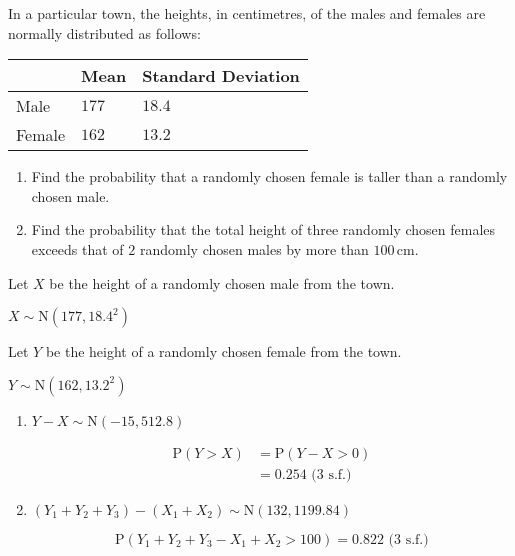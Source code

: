 \documentclass[11pt,a4paper]{book}
\begin{document}
\newpage

\begin{example}

In a particular town, the heights, in centimetres, of the males and
females are normally distributed as follows:
\begin{center}
\setlength{\extrarowheight}{2pt}%
\begin{tabular}{|>{\centering}p{4cm}|>{\centering}p{4cm}|>{\centering}p{4cm}|}
\hline
 & Mean & Standard Deviation\tabularnewline
\hline
Male & $177$ & $18.4$\tabularnewline
\hline
Female & $162$ & $13.2$\tabularnewline
\hline
\end{tabular}
\par\end{center}

\begin{enumerate}[label=(\alph*)]

\item  Find the probability that a randomly chosen female is taller
than a randomly chosen male.

\item  Find the probability that the total height of three randomly
chosen females exceeds that of $2$ randomly chosen males by more
than $100\,\text{cm}$.

\end{enumerate}

\Solution

Let $X$ be the height of a randomly chosen male from the town.

$X\sim\text{N}\left(177,18.4^{2}\right)$

Let $Y$ be the height of a randomly chosen female from the town.

$Y\sim\text{N}\left(162,13.2^{2}\right)$

\begin{enumerate}[label=(\alph*)]

\item  $Y-X\sim\text{N}\left(-15,512.8\right)$

\begin{align*}
\text{P}\left(Y>X\right) & =\text{P}\left(Y-X>0\right)\\
 & =0.254\text{ (3 s.f.)}
\end{align*}

\item  $\left(Y_{1}+Y_{2}+Y_{3}\right)-\left(X_{1}+X_{2}\right)\sim\text{N}\left(132,1199.84\right)$

\[
\text{P}\left(Y_{1}+Y_{2}+Y_{3}-X_{1}+X_{2}>100\right)=0.822\text{ (3 s.f.)}
\]

\end{enumerate}

\end{example}
\end{document}
